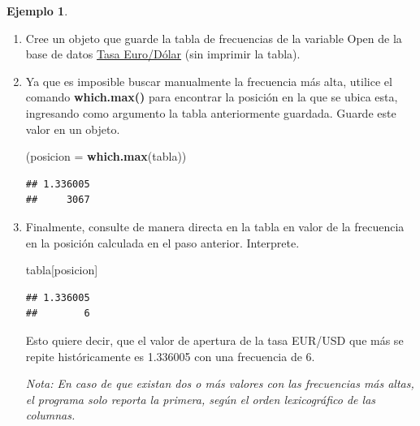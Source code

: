 \documentclass[
  11pt,
]{book}
\newenvironment{Shaded}{\begin{snugshade}}{\end{snugshade}}
\newcommand{\AttributeTok}[1]{\textcolor[rgb]{0.13,0.29,0.53}{#1}}
\newcommand{\FunctionTok}[1]{\textcolor[rgb]{0.13,0.29,0.53}{\textbf{#1}}}
\newcommand{\NormalTok}[1]{#1}
\newcommand{\OtherTok}[1]{\textcolor[rgb]{0.56,0.35,0.01}{#1}}
\newcommand{\SpecialCharTok}[1]{\textcolor[rgb]{0.81,0.36,0.00}{\textbf{#1}}}
\theoremstyle{definition}
\theoremstyle{definition}
\newtheorem{example}{Ejemplo}[chapter]
\theoremstyle{definition}
\theoremstyle{definition}
\theoremstyle{remark}
\begin{document}
\begin{example}
\leavevmode

\begin{enumerate}
\def\labelenumi{\arabic{enumi}.}
\item
  Cree un objeto que guarde la tabla de frecuencias de la variable Open de la base de datos \hyperref[TasaEURUSD]{Tasa Euro/Dólar} (sin imprimir la tabla).

\begin{Shaded}
\end{Shaded}
\item
  Ya que es imposible buscar manualmente la frecuencia más alta, utilice el comando \textbf{which.max()} para encontrar la posición en la que se ubica esta, ingresando como argumento la tabla anteriormente guardada. Guarde este valor en un objeto.

\begin{Shaded}
\begin{Highlighting}[]
\NormalTok{(}\AttributeTok{posicion =} \FunctionTok{which.max}\NormalTok{(tabla))}
\end{Highlighting}
\end{Shaded}

\begin{verbatim}
## 1.336005 
##     3067
\end{verbatim}
\item
  Finalmente, consulte de manera directa en la tabla en valor de la frecuencia en la posición calculada en el paso anterior. Interprete.

\begin{Shaded}
\begin{Highlighting}[]
\NormalTok{tabla[posicion]}
\end{Highlighting}
\end{Shaded}

\begin{verbatim}
## 1.336005 
##        6
\end{verbatim}

  Esto quiere decir, que el valor de apertura de la tasa EUR/USD que más se repite históricamente es 1.336005 con una frecuencia de 6.

  \emph{Nota: En caso de que existan dos o más valores con las frecuencias más altas, el programa solo reporta la primera, según el orden lexicográfico de las columnas.}
\end{enumerate}

\end{example}
\end{document}
